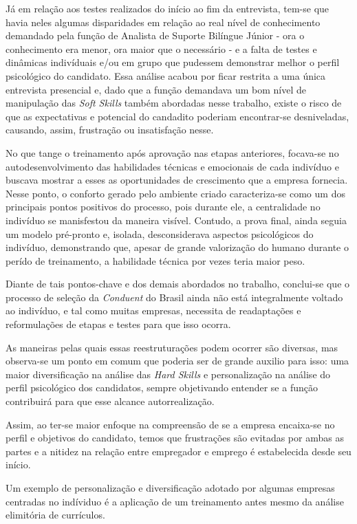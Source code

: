 \documentclass[12pt]{article}
\begin{document}
Já em relação aos testes realizados do início ao fim da entrevista, tem-se que havia neles algumas disparidades em relação ao real nível de conhecimento demandado pela função de Analista de Suporte Bilíngue Júnior - ora o conhecimento era menor, ora maior que o necessário - e a falta de testes e dinâmicas indivíduais e/ou em grupo que pudessem demonstrar melhor o perfil psicológico do candidato. Essa análise acabou por ficar restrita a uma única entrevista presencial e, dado que a função demandava um bom nível de manipulação das \emph{Soft Skills} também abordadas nesse trabalho, existe o risco de que as expectativas e potencial do candadito poderiam encontrar-se desniveladas, causando, assim, frustração ou insatisfação nesse.

No que tange o treinamento após aprovação nas etapas anteriores, focava-se no autodesenvolvimento das habilidades técnicas e emocionais de cada indivíduo e buscava mostrar a esses as oportunidades de crescimento que a empresa fornecia. Nesse ponto, o conforto gerado pelo ambiente criado caracteriza-se como um dos principais pontos positivos do processo, pois durante ele, a centralidade no indivíduo se manisfestou da maneira visível. Contudo, a prova final, ainda seguia um modelo pré-pronto e, isolada, desconsiderava aspectos psicológicos do indivíduo, demonstrando que, apesar de grande valorização do humano durante o perído de treinamento, a habilidade técnica por vezes teria maior peso. 

Diante de tais pontos-chave e dos demais abordados no trabalho, conclui-se que o processo de seleção da  \emph{Conduent} do Brasil ainda não está integralmente voltado ao indivíduo, e tal como muitas empresas, necessita de readaptações e reformulações de etapas e testes para que isso ocorra. 

As maneiras pelas quais essas reestruturações podem ocorrer são diversas, mas observa-se um ponto em comum que poderia ser de grande auxilio para isso: uma maior diversificação na análise das \emph{Hard Skills} e personalização na análise do perfil psicológico dos candidatos, sempre objetivando entender se a função contribuirá para que esse alcance autorrealização.

Assim, ao ter-se maior enfoque na compreensão de se a empresa encaixa-se no perfil e objetivos do candidato, temos que frustrações são evitadas por ambas as partes e a nitidez na relação entre empregador e emprego é estabelecida desde seu início. 

Um exemplo de personalização e diversificação adotado por algumas empresas centradas no indíviduo é a aplicação de um treinamento antes mesmo da análise elimitória de currículos. 
\end{document}
